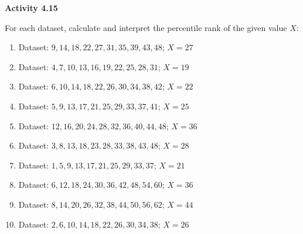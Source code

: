 \vspace{0.3ex}
\noindent\textbf{Activity 4.15}

\vspace{0.2ex}

For each dataset, calculate and interpret the percentile rank of the given value \(X\):

\begin{enumerate}
    \item Dataset: \(9, 14, 18, 22, 27, 31, 35, 39, 43, 48\); \(X = 27\)  
    \item Dataset: \(4, 7, 10, 13, 16, 19, 22, 25, 28, 31\); \(X = 19\)  
    \item Dataset: \(6, 10, 14, 18, 22, 26, 30, 34, 38, 42\); \(X = 22\)  
    \item Dataset: \(5, 9, 13, 17, 21, 25, 29, 33, 37, 41\); \(X = 25\)  
    \item Dataset: \(12, 16, 20, 24, 28, 32, 36, 40, 44, 48\); \(X = 36\)  
    \item Dataset: \(3, 8, 13, 18, 23, 28, 33, 38, 43, 48\); \(X = 28\)  
    \item Dataset: \(1, 5, 9, 13, 17, 21, 25, 29, 33, 37\); \(X = 21\)  
    \item Dataset: \(6, 12, 18, 24, 30, 36, 42, 48, 54, 60\); \(X = 36\)  
    \item Dataset: \(8, 14, 20, 26, 32, 38, 44, 50, 56, 62\); \(X = 44\)  
    \item Dataset: \(2, 6, 10, 14, 18, 22, 26, 30, 34, 38\); \(X = 26\)  
\end{enumerate}
